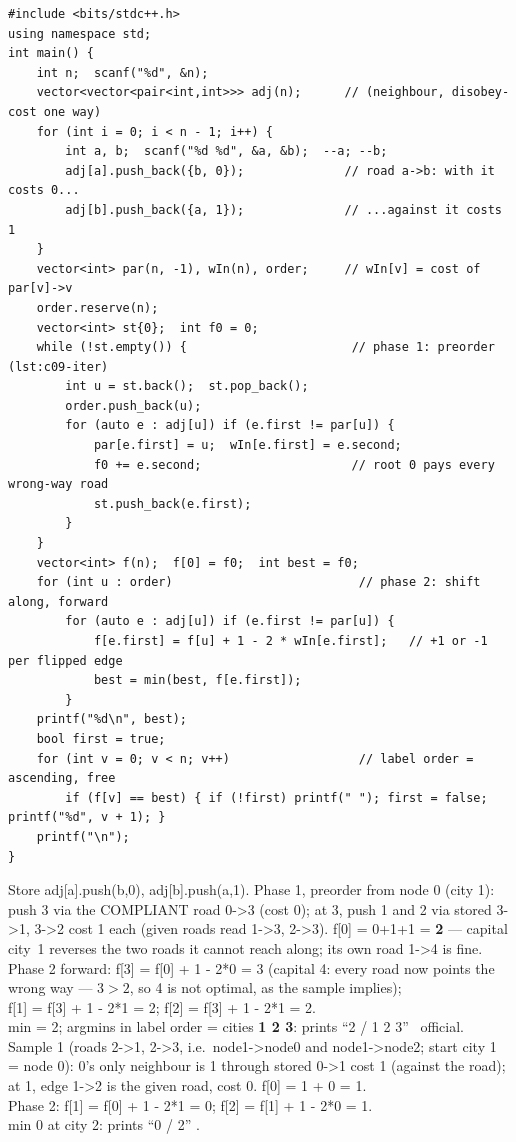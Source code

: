 \begin{lstlisting}[caption={Codeforces 219D -- two-phase reroot on the reversal cost}, label={lst:c09-219d-soln}]
#include <bits/stdc++.h>
using namespace std;
int main() {
    int n;  scanf("%d", &n);
    vector<vector<pair<int,int>>> adj(n);      // (neighbour, disobey-cost one way)
    for (int i = 0; i < n - 1; i++) {
        int a, b;  scanf("%d %d", &a, &b);  --a; --b;
        adj[a].push_back({b, 0});              // road a->b: with it costs 0...
        adj[b].push_back({a, 1});              // ...against it costs 1
    }
    vector<int> par(n, -1), wIn(n), order;     // wIn[v] = cost of par[v]->v
    order.reserve(n);
    vector<int> st{0};  int f0 = 0;
    while (!st.empty()) {                       // phase 1: preorder (lst:c09-iter)
        int u = st.back();  st.pop_back();
        order.push_back(u);
        for (auto e : adj[u]) if (e.first != par[u]) {
            par[e.first] = u;  wIn[e.first] = e.second;
            f0 += e.second;                     // root 0 pays every wrong-way road
            st.push_back(e.first);
        }
    }
    vector<int> f(n);  f[0] = f0;  int best = f0;
    for (int u : order)                          // phase 2: shift along, forward
        for (auto e : adj[u]) if (e.first != par[u]) {
            f[e.first] = f[u] + 1 - 2 * wIn[e.first];   // +1 or -1 per flipped edge
            best = min(best, f[e.first]);
        }
    printf("%d\n", best);
    bool first = true;
    for (int v = 0; v < n; v++)                  // label order = ascending, free
        if (f[v] == best) { if (!first) printf(" "); first = false; printf("%d", v + 1); }
    printf("\n");
}
\end{lstlisting}

\begin{tracebox}
Store adj[a].push(b,0), adj[b].push(a,1). Phase 1, preorder from node 0 (city 1):
push 3 via the COMPLIANT road 0->3 (cost 0); at 3, push 1 and 2 via stored 3->1, 3->2
cost 1 each (given roads read 1->3, 2->3). f[0] = 0+1+1 = \textbf{2} --- capital city~1
reverses the two roads it cannot reach along; its own road 1->4 is fine.\\
Phase 2 forward: f[3] = f[0] + 1 - 2*0 = 3 (capital 4: every road now points the wrong
way --- $3 > 2$, so 4 is not optimal, as the sample implies);\\
f[1] = f[3] + 1 - 2*1 = 2; \quad f[2] = f[3] + 1 - 2*1 = 2.\\
min = 2; argmins in label order = cities \textbf{1 2 3}: prints ``2 / 1 2 3''
\checkmark\ official. Sample 1 (roads 2->1, 2->3, i.e.\ node1->node0 and node1->node2;
start city 1 = node 0): 0's only neighbour is 1 through stored 0->1 cost 1 (against the
road); at 1, edge 1->2 is the given road, cost 0. f[0] = 1 + 0 = 1.\\
Phase 2: f[1] = f[0] + 1 - 2*1 = 0; \quad f[2] = f[1] + 1 - 2*0 = 1.\\
min 0 at city 2: prints ``0 / 2'' \checkmark.\end{tracebox}

